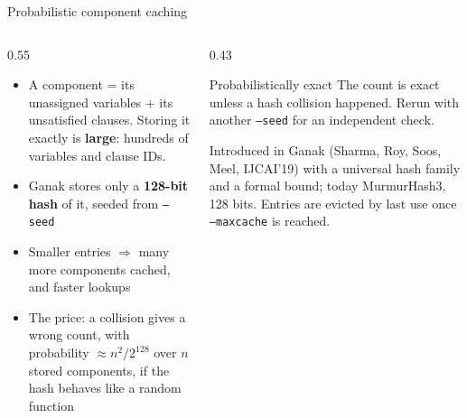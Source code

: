 \documentclass[aspectratio=169]{beamer}
\newcommand{\ganak}{\textsf{Ganak}}
\begin{document}
\begin{frame}{Probabilistic component caching}
  \begin{columns}[T]
    \begin{column}{0.55\textwidth}
      \small
      \begin{itemize}
        \item A component = its unassigned variables + its
          unsatisfied clauses. Storing it exactly is \textbf{large}:
          hundreds of variables and clause IDs.
        \item \ganak{} stores only a \textbf{128-bit hash} of it,
          seeded from \texttt{--seed}
        \item Smaller entries $\Rightarrow$ many more components cached,
          and faster lookups
        \item The price: a collision gives a wrong count, with
          probability $\approx n^2 / 2^{128}$ over $n$ stored components,
          if the hash behaves like a random function
      \end{itemize}
    \end{column}
    \begin{column}{0.43\textwidth}
      \begin{block}{\small Probabilistically exact}
        \small The count is exact unless a hash collision happened.
        Rerun with another \texttt{--seed} for an independent check.
      \end{block}
      \scriptsize Introduced in \ganak{} (Sharma, Roy, Soos, Meel, IJCAI'19)
      with a universal hash family and a formal bound; today MurmurHash3,
      128 bits. Entries are evicted by last use once \texttt{--maxcache} is reached.
    \end{column}
  \end{columns}
\end{frame}
\end{document}
